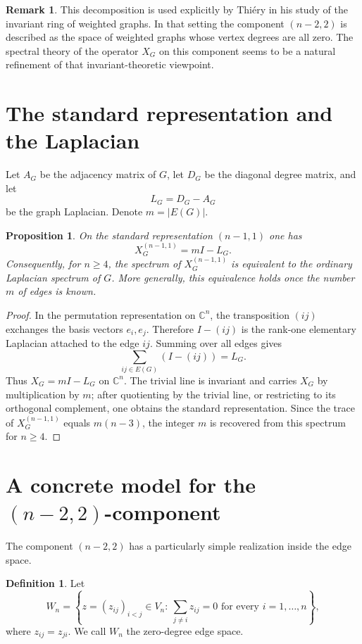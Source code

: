 \documentclass{amsart}
\newtheorem{proposition}{Proposition}
\theoremstyle{definition}
\newtheorem{definition}{Definition}
\newtheorem{remark}{Remark}
\newcommand{\C}{\mathbb C}
\begin{document}
\begin{remark}
This decomposition is used explicitly by Thi\'ery \cite{Thiery} in his study of the
invariant ring of weighted graphs.  In that setting the component
$(n-2,2)$ is described as the space of weighted graphs whose vertex
degrees are all zero.  The spectral theory of the operator $X_G$ on this
component seems to be a natural refinement of that invariant-theoretic
viewpoint.
\end{remark}

\section{The standard representation and the Laplacian}

Let $A_G$ be the adjacency matrix of $G$, let $D_G$ be the diagonal degree
matrix, and let
\[
L_G=D_G-A_G
\]
be the graph Laplacian.  Denote $m=|E(G)|$.

\begin{proposition}
On the standard representation $(n-1,1)$ one has
\[
X_G^{(n-1,1)}=mI-L_G.
\]
Consequently, for $n\geq 4$, the spectrum of $X_G^{(n-1,1)}$ is equivalent
to the ordinary Laplacian spectrum of $G$.  More generally, this equivalence
holds once the number $m$ of edges is known.
\end{proposition}

\begin{proof}
In the permutation representation on $\C^n$, the transposition $(ij)$
exchanges the basis vectors $e_i,e_j$.  Therefore $I-(ij)$ is the
rank-one elementary Laplacian attached to the edge $ij$.  Summing over
all edges gives
\[
\sum_{ij\in E(G)}(I-(ij))=L_G.
\]
Thus $X_G=mI-L_G$ on $\C^n$.  The trivial line is invariant and carries
$X_G$ by multiplication by $m$; after quotienting by the trivial line, or
restricting to its orthogonal complement, one obtains the standard
representation.  Since the trace of $X_G^{(n-1,1)}$ equals $m(n-3)$, the
integer $m$ is recovered from this spectrum for $n\geq 4$.
\end{proof}

\section{A concrete model for the $(n-2,2)$-component}

The component $(n-2,2)$ has a particularly simple realization inside the
edge space.

\begin{definition}
Let
\[
W_n=\left\{z=(z_{ij})_{i<j}\in V_n:\
        \sum_{j\ne i} z_{ij}=0\text{ for every }i=1,\ldots,n\right\},
\]
where $z_{ij}=z_{ji}$.  We call $W_n$ the zero-degree edge space.
\end{definition}
\end{document}
